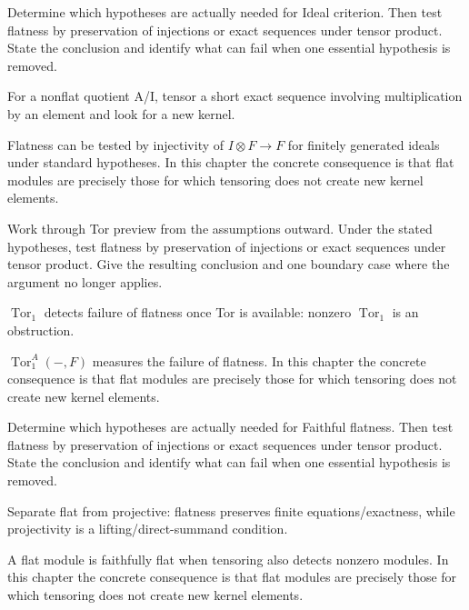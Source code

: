 \begin{exercise}\label{exr:v14-06}
Determine which hypotheses are actually needed for Ideal criterion. Then test flatness by preservation of injections or exact sequences under tensor product. State the conclusion and identify what can fail when one essential hypothesis is removed.
\end{exercise}
\begin{hint}
For a nonflat quotient A/I, tensor a short exact sequence involving multiplication by an element and look for a new kernel.
\end{hint}
\begin{solution}
Flatness can be tested by injectivity of $I\otimes F\to F$ for finitely generated ideals under standard hypotheses. In this chapter the concrete consequence is that flat modules are precisely those for which tensoring does not create new kernel elements.
\end{solution}

\begin{exercise}\label{exr:v14-07}
Work through Tor preview from the assumptions outward. Under the stated hypotheses, test flatness by preservation of injections or exact sequences under tensor product. Give the resulting conclusion and one boundary case where the argument no longer applies.
\end{exercise}
\begin{hint}
\(\operatorname{Tor}_1\) detects failure of flatness once Tor is available: nonzero \(\operatorname{Tor}_1\) is an obstruction.
\end{hint}
\begin{solution}
$\operatorname{Tor}_1^A(-,F)$ measures the failure of flatness. In this chapter the concrete consequence is that flat modules are precisely those for which tensoring does not create new kernel elements.
\end{solution}

\begin{exercise}\label{exr:v14-08}
Determine which hypotheses are actually needed for Faithful flatness. Then test flatness by preservation of injections or exact sequences under tensor product. State the conclusion and identify what can fail when one essential hypothesis is removed.
\end{exercise}
\begin{hint}
Separate flat from projective: flatness preserves finite equations/exactness, while projectivity is a lifting/direct-summand condition.
\end{hint}
\begin{solution}
A flat module is faithfully flat when tensoring also detects nonzero modules. In this chapter the concrete consequence is that flat modules are precisely those for which tensoring does not create new kernel elements.
\end{solution}

